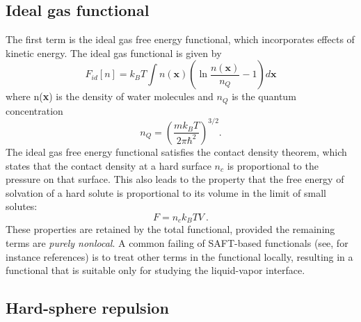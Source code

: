 \documentclass[letterpaper,twocolumn,amsmath,amssymb,prb]{revtex4-1}
\newcommand{\xx}{\textbf{x}}
\begin{document}
\subsection{Ideal gas functional}
The first term is the ideal gas free energy functional, which
incorporates effects of kinetic energy.  The ideal gas functional is
given by
\begin{equation}\label{idealgas}
  F_{id}[n] = k_B T \int n(\xx)\left( \ln{\frac{n(\xx)}{n_Q}} - 1\right) d\xx
\end{equation}
where n(\xx) is the density of water molecules and $n_Q$ is the
quantum concentration
\begin{equation}\label{quantumconcentration}
 n_Q =\left(\frac{mk_BT}{2\pi\hbar^2}\right)^{3/2}.
\end{equation}
The ideal gas free energy functional satisfies the contact density
theorem, which states that the contact density at a hard surface $n_c$
is proportional to the pressure on that surface. This
also leads to the property that the free energy of solvation of
a hard solute is proportional to its volume in the limit of small
solutes: 
\begin{equation}\label{contactvaluethm}
  F = n_c k_BT V\:.
\end{equation}
These properties are retained by the total functional,
provided the remaining terms are \emph{purely nonlocal}.  A common
failing of SAFT-based functionals (see, for instance
references\cite{felipe2001examination, gloor2002saft,
  gloor2004accurate, clark2006developing, gloor2007prediction,
  kahl2008modified, gross2009density}) is to treat other terms in the
functional locally, resulting in a functional that is suitable only
for studying the liquid-vapor interface.


\subsection{Hard-sphere repulsion}
\end{document}
